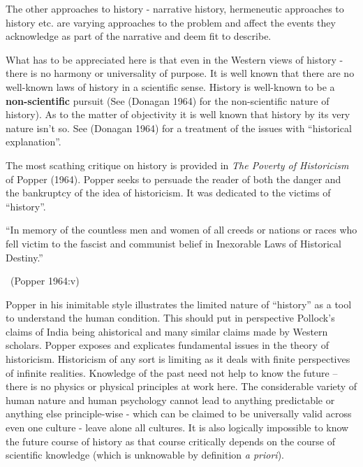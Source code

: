 The other approaches to history - narrative history, hermeneutic approaches to history etc. are varying approaches to the problem and affect the events they acknowledge as part of the narrative and deem fit to describe.

What has to be appreciated here is that even in the Western views of history - there is no harmony or universality of purpose. It is well known that there are no well-known laws of history in a scientific sense. History is well-known to be a \textbf{non-scientific} pursuit (See (Donagan 1964) for the non-scientific nature of history). As to the matter of objectivity it is well known that history by its very nature isn’t so. See (Donagan 1964) for a treatment of the issues with “historical explanation”.

The most scathing critique on history is provided in \textit{The Poverty of Historicism} of Popper (1964). Popper seeks to persuade the reader of both the danger and the bankruptcy of the idea of historicism. It was dedicated to the victims of “history”.

\newpage

\begin{myquote}
“In memory of the countless men and women of all creeds or nations or races who fell victim to the fascist and communist belief in Inexorable Laws of Historical Destiny.”

\vskip -5pt

~\hfill (Popper 1964:v)
\end{myquote}

\vskip 5pt

Popper in his inimitable style illustrates the limited nature of “history” as a tool to understand the human condition. This should put in perspective Pollock’s claims of India being ahistorical and many similar claims made by Western scholars. Popper exposes and explicates fundamental issues in the theory of historicism. Historicism of any sort is limiting as it deals with finite perspectives of infinite realities. Knowledge of the past need not help to know the future – there is no physics or physical principles at work here. The considerable variety of human nature and human psychology cannot lead to anything predictable or anything else principle-wise - which can be claimed to be universally valid across even one culture - leave alone all cultures. It is also logically impossible to know the future course of history as that course critically depends on the course of scientific knowledge (which is unknowable by definition \textit{a priori}).

